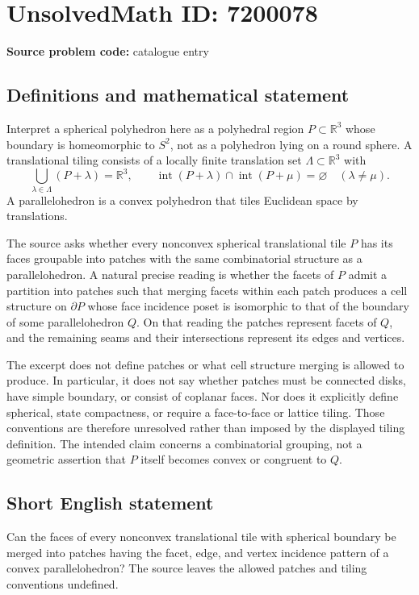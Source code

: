 \documentclass[11pt]{article}
\newcommand{\R}{\mathbb{R}}
\begin{document}
\section*{UnsolvedMath ID: 7200078}
\textbf{Source problem code:} catalogue entry
\subsection{Definitions and mathematical statement}
Interpret a spherical polyhedron here as a polyhedral region \(P\subset\R^3\) whose boundary is homeomorphic to \(S^2\), not as a polyhedron lying on a round sphere. A translational tiling consists of a locally finite translation set \(\Lambda\subset\R^3\) with
\[
 \bigcup_{\lambda\in\Lambda}(P+\lambda)=\R^3,\qquad
 \operatorname{int}(P+\lambda)\cap\operatorname{int}(P+\mu)=\varnothing\quad(\lambda\ne\mu).
\]
A parallelohedron is a convex polyhedron that tiles Euclidean space by translations.

The source asks whether every nonconvex spherical translational tile \(P\) has its faces groupable into patches with the same combinatorial structure as a parallelohedron. A natural precise reading is whether the facets of \(P\) admit a partition into patches such that merging facets within each patch produces a cell structure on \(\partial P\) whose face incidence poset is isomorphic to that of the boundary of some parallelohedron \(Q\). On that reading the patches represent facets of \(Q\), and the remaining seams and their intersections represent its edges and vertices.

The excerpt does not define patches or what cell structure merging is allowed to produce. In particular, it does not say whether patches must be connected disks, have simple boundary, or consist of coplanar faces. Nor does it explicitly define spherical, state compactness, or require a face-to-face or lattice tiling. Those conventions are therefore unresolved rather than imposed by the displayed tiling definition. The intended claim concerns a combinatorial grouping, not a geometric assertion that \(P\) itself becomes convex or congruent to \(Q\).
\subsection{Short English statement}
Can the faces of every nonconvex translational tile with spherical boundary be merged into patches having the facet, edge, and vertex incidence pattern of a convex parallelohedron? The source leaves the allowed patches and tiling conventions undefined.
\end{document}
